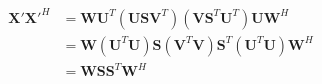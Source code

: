 \documentclass[10pt]{article}
\begin{document}
\begin{align*}\begin{split}
\boldsymbol X' \boldsymbol X'^H &= 
\boldsymbol W \boldsymbol U^T \left( \boldsymbol U \boldsymbol S \boldsymbol V^T\right)
\left( \boldsymbol V \boldsymbol S^T \boldsymbol U^T \right) \boldsymbol U \boldsymbol W^H \\
&= \boldsymbol W \left( \boldsymbol U^T \boldsymbol U \right)
\boldsymbol S \left(\boldsymbol V^T \boldsymbol V\right) \boldsymbol S^T
\left( \boldsymbol U^T \boldsymbol U \right) \boldsymbol W^H \\
&= \boldsymbol W \boldsymbol S \boldsymbol S^T \boldsymbol W^H \\
\end{split}\end{align*}
\end{document}
